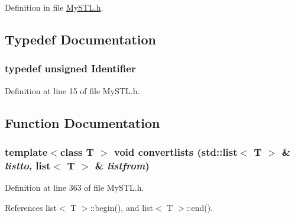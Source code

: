 Definition in file \hyperlink{MySTL_8h_source}{MySTL.h}.



\subsection{Typedef Documentation}
\subsubsection[{Identifier}]{\setlength{\rightskip}{0pt plus 5cm}typedef unsigned {\bf Identifier}}\label{MySTL_8h_a25e0b8ddd193bb84ebf6c0eeff6b1c82}


Definition at line 15 of file MySTL.h.



\subsection{Function Documentation}
\subsubsection[{convertlists}]{\setlength{\rightskip}{0pt plus 5cm}template$<$class T $>$ void convertlists (std::list$<$ T $>$ \& {\em listto}, \/  {\bf list}$<$ T $>$ \& {\em listfrom})}\label{MySTL_8h_a18d844193db32a138abf249064eb94fe}


Definition at line 363 of file MySTL.h.



References list$<$ T $>$::begin(), and list$<$ T $>$::end().

